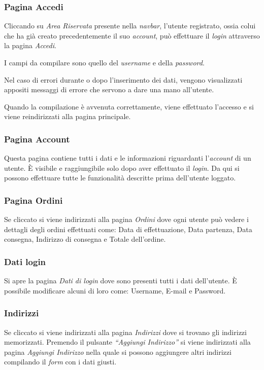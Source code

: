 \subsubsection{Pagina Accedi}
Cliccando su \textit{Area Riservata} presente nella \textit{navbar}, l’utente registrato, ossia colui che ha già creato precedentemente il suo \textit{account}, può effettuare il \textit{login} attraverso la pagina \textit{Accedi}.

I campi da compilare sono quello del \textit{username} e della \textit{password}.

Nel caso di errori durante o dopo l’inserimento dei dati, vengono visualizzati appositi messaggi di errore che servono a dare una mano all’utente.

Quando la compilazione è avvenuta correttamente, viene effettuato l’accesso e si viene reindirizzati alla pagina principale.

\subsubsection{Pagina Account}
Questa pagina contiene tutti i dati e le informazioni riguardanti l’\textit{account} di un utente. È visibile e raggiungibile solo dopo aver effettuato il \textit{login}. Da qui si possono effettuare tutte le funzionalità descritte prima dell'utente loggato.

\subsubsection{Pagina Ordini}
Se cliccato si viene indirizzati alla pagina \textit{Ordini} dove ogni utente può vedere i dettagli degli ordini effettuati come: Data di effettuazione, Data partenza, Data consegna, Indirizzo di consegna e Totale dell'ordine.

\subsubsection{Dati login}
Si apre la pagina \textit{Dati di login} dove sono presenti tutti i dati dell'utente. È possibile modificare alcuni di loro come: Username, E-mail e Password.

\subsubsection{Indirizzi}
Se cliccato si viene indirizzati alla pagina \textit{Indirizzi} dove si trovano gli indirizzi memorizzati. Premendo il pulsante \textit{“Aggiungi Indirizzo”} si viene indirizzati alla pagina \textit{Aggiungi Indirizzo} nella quale si possono aggiungere altri indirizzi compilando il \textit{form} con i dati giusti.

